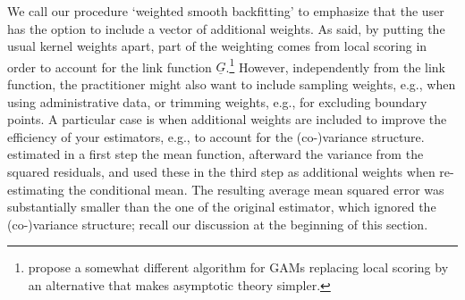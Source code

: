 We call our procedure `weighted smooth backfitting' to emphasize that the user has the option to include a vector of additional weights. %
As said, by putting the usual kernel weights apart,
part of the weighting comes from local scoring in order to account for the link function
$\underline{G}$.\footnote{%
    \citet{YPM2008} propose a somewhat different algorithm for GAMs replacing local scoring by an alternative that makes asymptotic theory simpler.} 
However, independently from the link function, the practitioner might also want to include sampling weights, e.g., when using administrative data, or trimming weights, e.g., for excluding boundary points. A particular case is when additional weights are included to improve the efficiency of your estimators, e.g., to account for the (co-)variance structure.   \citet{RS2010} estimated in a first step the mean function, afterward the variance from the squared residuals, and used these in the third step as additional weights when re-estimating the conditional mean. The resulting average mean squared error was substantially smaller than the one of the original estimator, which ignored the (co-)variance structure; recall our discussion at the beginning of this section. 

